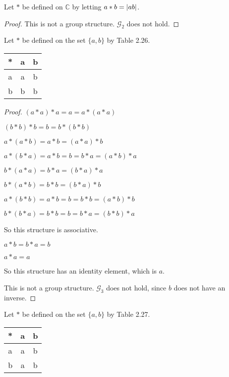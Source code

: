 \newpage
\begin{exercise}
    Let $*$ be defined on $\mathbb{C}$ by letting $a * b = \left\vert{ab}\right\vert$.
\end{exercise}

\begin{proof}
    This is not a group structure. $\mathcal{G}_{2}$ does not hold.
\end{proof}

\newpage
\begin{exercise}
    Let $*$ be defined on the set $\{ a, b \}$ by Table 2.26.
    \begin{tabular}{c|cc}
        * & a & b \\
        \hline
        a & a & b \\
        b & b & b
    \end{tabular}
\end{exercise}

\begin{proof}
    $(a * a) * a = a = a * (a * a)$

    $(b * b) * b = b = b * (b * b)$

    $a * (a * b) = a * b = (a * a) * b$

    $a * (b * a) = a * b = b = b * a = (a * b) * a$

    $b * (a * a) = b * a = (b * a) * a$

    $b * (a * b) = b * b = (b * a) * b$

    $a * (b * b) = a * b = b = b * b = (a * b) * b$

    $b * (b * a) = b * b = b = b * a = (b * b) * a$

    So this structure is associative.

    $a * b = b * a = b$

    $a * a = a$

    So this structure has an identity element, which is $a$.

    This is not a group structure. $\mathcal{G}_{3}$ does not hold, since $b$ does not have an inverse.
\end{proof}

\newpage
\begin{exercise}
    Let $*$ be defined on the set $\{ a, b \}$ by Table 2.27.
    \begin{tabular}{c|cc}
        * & a & b \\
        \hline
        a & a & b \\
        b & a & b
    \end{tabular}
\end{exercise}


